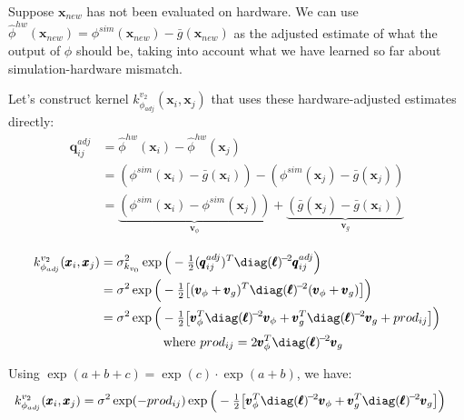 Suppose $\pmb{x}_{new}$ has not been evaluated on hardware. We can use $\hat{\phi}^{hw}(\pmb{x}_{new}) = \phi^{sim}(\pmb{x}_{new}) - \bar{g}(\pmb{x}_{new})$ as the adjusted estimate of what the output of $\phi$ should be, taking into account what we have learned so far about simulation-hardware mismatch.

Let's construct kernel $k^{v_2}_{\phi_{adj}}(\pmb{x}_i, \pmb{x}_j)$ that uses these hardware-adjusted estimates directly:
\begin{equation*}
\begin{split}
\pmb{q}_{ij}^{adj} &= \hat{\phi}^{hw}(\pmb{x}_{i}) - \hat{\phi}^{hw}(\pmb{x}_{j}) \\
&= (\phi^{sim}(\pmb{x}_{i}) - \bar{g}(\pmb{x}_i)) - (\phi^{sim}(\pmb{x}_{j}) - \bar{g}(\pmb{x}_j) ) \\
&= \underbrace{(\phi^{sim}(\pmb{x}_{i}) - \phi^{sim}(\pmb{x}_{j}))}_{\pmb{v}_{\phi}} + \underbrace{(\bar{g}(\pmb{x}_j) - \bar{g}(\pmb{x}_i) )}_{\pmb{v}_{g}}
\end{split}
\end{equation*}

\begin{equation*}
\begin{split}
k^{v_2}_{\phi_{adj}}(\pmb{x}_i, \pmb{x}_j) &= \sigma^2_{k_{v_0}} \exp\Big(- \tfrac{1}{2} (\pmb{q}_{ij}^{adj})^T \diag(\pmb{\ell})^{\!-\!2} \pmb{q}_{ij}^{adj} \Big) \\
& = \sigma^2 \exp\Big(- \tfrac{1}{2} \big[ (\pmb{v}_{\phi} + \pmb{v}_{g})^T \diag(\pmb{\ell})^{\!-\!2} (\pmb{v}_{\phi} + \pmb{v}_{g}) \big] \Big) \\
& = \sigma^2
\exp\Big(- \tfrac{1}{2} \big[ \pmb{v}_{\phi}^T \diag(\pmb{\ell})^{\!-\!2} \pmb{v}_{\phi} + \pmb{v}_{g}^T\diag(\pmb{\ell})^{\!-\!2} \pmb{v}_{g} + prod_{ij} \big] \Big)\\
&\quad \quad \quad \quad \quad \text{where } prod_{ij} = 2 \pmb{v}_{\phi}^T\diag(\pmb{\ell})^{\!-\!2} \pmb{v}_{g}
\end{split}
\end{equation*}

Using $\exp(a+b+c)=\exp(c) \cdot \exp(a+b)$,  we have:
\begin{align*}
k^{v_2}_{\phi_{adj}}(\pmb{x}_i, \pmb{x}_j) &= \sigma^2 \exp(-prod_{ij}) \exp\Big(- \tfrac{1}{2} \big[ \pmb{v}_{\phi}^T \diag(\pmb{\ell})^{\!-\!2} \pmb{v}_{\phi} + \pmb{v}_{g}^T\diag(\pmb{\ell})^{\!-\!2} \pmb{v}_{g} \big] \Big)
\end{align*}

